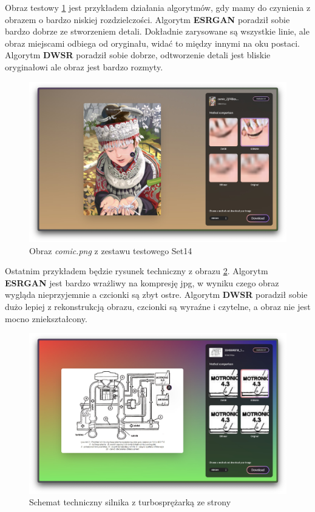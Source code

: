 Obraz testowy \ref{fig:image104} jest przykładem działania algorytmów, gdy mamy do czynienia z obrazem o bardzo niskiej rozdzielczości. Algorytm \textbf{ESRGAN} poradził sobie bardzo dobrze ze stworzeniem detali. Dokładnie zarysowane są wszystkie linie, ale obraz miejscami odbiega od oryginału, widać to między innymi na oku postaci. Algorytm \textbf{DWSR} poradził sobie dobrze, odtworzenie detali jest bliskie oryginałowi ale obraz jest bardzo rozmyty.


\begin{figure}[H]
    \centering
    \includegraphics[width=0.9\linewidth]{Rozdziały/05.Porownanie_algorytmow/Obrazy/Zrzut ekranu comic.jpg}  
    \caption{Obraz \textit{comic.png} z zestawu testowego Set14 \cite{zeyde2010single}}
    \label{fig:image104}
\end{figure}

Ostatnim przykładem będzie rysunek techniczny z obrazu \ref{fig:image105}. Algorytm \textbf{ESRGAN} jest bardzo wrażliwy na kompresję jpg, w wyniku czego obraz wygląda nieprzyjemnie a czcionki są zbyt ostre.  Algorytm \textbf{DWSR} poradził sobie dużo lepiej z rekonstrukcją obrazu, czcionki są wyraźne i czytelne, a obraz nie jest mocno zniekształcony.

\begin{figure}[H]
    \centering
    \includegraphics[width=0.85\linewidth]{Rozdziały/05.Porownanie_algorytmow/Obrazy/Zrzut ekranu 2023-12-12 o 14.20.22.jpg}  
    \caption{Schemat techniczny silnika z turbosprężarką ze strony \cite{zssplus} }
    \label{fig:image105}
\end{figure}

